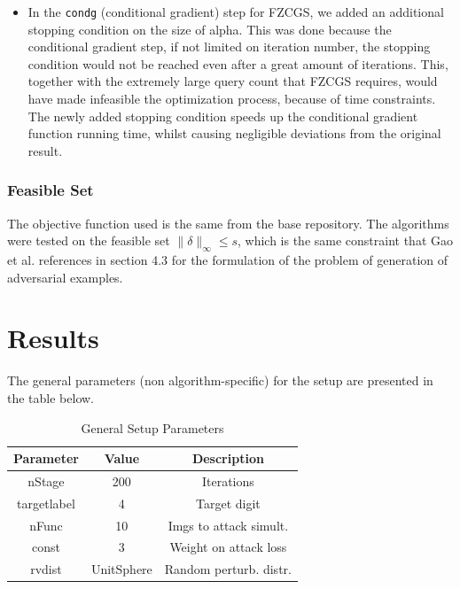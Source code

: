 \documentclass[10pt,twocolumn,letterpaper]{article}
\begin{document}
\begin{itemize}
   \item In the \texttt{condg} (conditional gradient) step for FZCGS,
   we added an additional stopping condition on the size of alpha.
   This was done because the conditional gradient step, if not limited
   on iteration number, the stopping condition would not be reached even
   after a great amount of iterations. This, together with the extremely large query count
   that FZCGS requires, would have made infeasible the optimization process,
   because of time constraints. The newly added stopping condition speeds up
   the conditional gradient function running time, whilst causing negligible
   deviations from the original result.
\end{itemize}

\subsubsection{Feasible Set}

The objective function used is the same from the base repository.
The algorithms were tested on the feasible set $\|\delta\|_{\infty} \leq s$,
which is the same constraint that Gao et al. references in section 4.3 for the formulation
of the problem of generation of adversarial examples.


\section{Results}

The general parameters (non algorithm-specific) for the setup are presented in the table below.

\begin{table}[h]
   \centering
   \begin{tabular}{ccc}
       \hline
       Parameter & Value & Description \\
       \hline
       nStage & 200 & Iterations\\
       \hline
       targetlabel & 4 & Target digit\\
       \hline
       nFunc & 10 & Imgs to attack simult.\\
       \hline
       const & 3 & Weight on attack loss\\
       \hline
       rvdist & UnitSphere & Random perturb. distr.\\ 
       \hline
   \end{tabular}
   \
   \caption{General Setup Parameters} 
   \label{tab:general_params}
\end{table}
\end{document}
